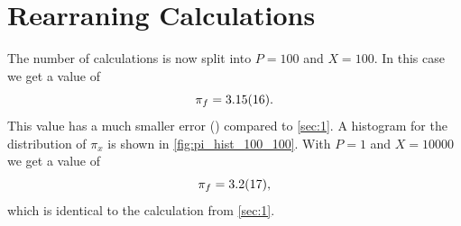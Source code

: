 \section{Rearraning Calculations}\label{sec:2}
The number of calculations is now split into $P = \num{100}$ and
$X = \num{100}$. In this case we get a value of
\begin{equation}
	\pi_f = \num{3.15 \pm 0.16}.
\end{equation}
This value has a much smaller error () compared to \cref{sec:1}. A histogram 
for the distribution of $\pi_x$ is shown in \cref{fig:pi_hist_100_100}.
With $P=1$ and $X = \num{10000}$ we get a value of 
\begin{equation}
    \pi_f = \num{3.2\pm 1.7},
\end{equation}
which is identical to the calculation from \cref{sec:1}.

